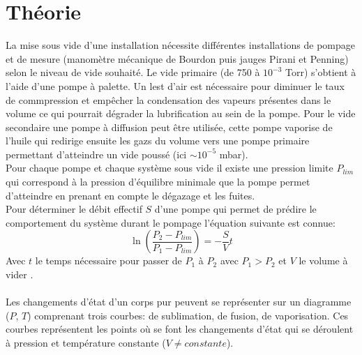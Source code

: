 \section{Théorie}



La mise sous vide d'une installation nécessite différentes installations de pompage et de mesure (manomètre mécanique de Bourdon puis jauges Pirani et Penning) selon le niveau de vide souhaité. Le vide primaire (de 750 à \(10^{-3}\) Torr) s'obtient à l'aide d'une pompe à palette. Un lest d'air est nécessaire pour diminuer le taux de commpression et empêcher la condensation des vapeurs présentes dans le volume ce qui pourrait dégrader la lubrification au sein de la pompe. Pour le vide secondaire une pompe à diffusion peut être utilisée, cette pompe vaporise de l'huile qui redirige ensuite les gazs du volume vers une pompe primaire permettant d'atteindre un vide poussé (ici \(\sim 10^{-5}\) mbar). \\
Pour chaque pompe et chaque système sous vide il existe une pression limite \(P_{lim}\) qui correspond à la pression d'équilibre minimale que la pompe permet d'atteindre en prenant en compte le dégazage et les fuites. \\
Pour déterminer le débit effectif \(S\) d'une pompe qui permet de prédire le comportement du système durant le pompage l'équation suivante est connue:
\begin{equation}
    \ln(\frac{P_2 - P_{lim}}{P_1 - P_{lim}}) = -\frac{S}{V}t
\end{equation}
Avec \(t\) le temps nécessaire pour passer de \(P_1\) à \(P_2\) avec \(P_1 > P_2\) et \(V\) le volume à vider \cite{notice}. \\
\\
Les changements d'état d'un corps pur peuvent se représenter sur un diagramme (\(P\), \(T\)) comprenant trois courbes: de sublimation, de fusion, de vaporisation. Ces courbes représentent les points où se font les changements d'état qui se déroulent à pression et température constante (\(V \neq constante\)). 

